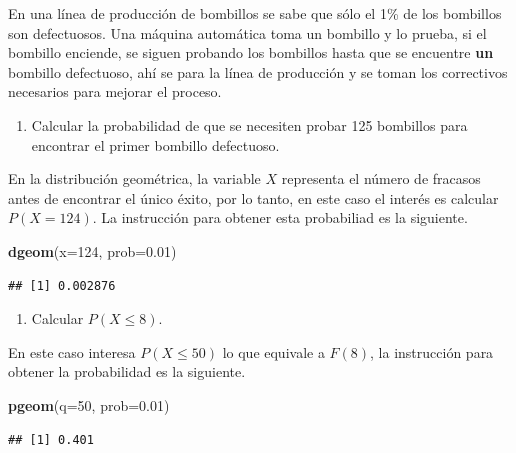 \documentclass[10pt,]{krantz}
\makeatletter
\newenvironment{Shaded}{\begin{snugshade}}{\end{snugshade}}
\newcommand{\KeywordTok}[1]{\textcolor[rgb]{0.13,0.29,0.53}{\textbf{{#1}}}}
\newcommand{\DataTypeTok}[1]{\textcolor[rgb]{0.13,0.29,0.53}{{#1}}}
\newcommand{\DecValTok}[1]{\textcolor[rgb]{0.00,0.00,0.81}{{#1}}}
\newcommand{\FloatTok}[1]{\textcolor[rgb]{0.00,0.00,0.81}{{#1}}}
\newcommand{\NormalTok}[1]{{#1}}
\providecommand{\tightlist}{%
  \setlength{\itemsep}{0pt}\setlength{\parskip}{0pt}}
\newenvironment{kframe}{%
\medskip{}
\setlength{\fboxsep}{.8em}
 \def\at@end@of@kframe{}%
 \ifinner\ifhmode%
  \def\at@end@of@kframe{\end{minipage}}%
  \begin{minipage}{\columnwidth}%
 \fi\fi%
 \def\FrameCommand##1{\hskip\@totalleftmargin \hskip-\fboxsep
 \colorbox{shadecolor}{##1}\hskip-\fboxsep
     \hskip-\linewidth \hskip-\@totalleftmargin \hskip\columnwidth}%
 \MakeFramed {\advance\hsize-\width
   \@totalleftmargin\z@ \linewidth\hsize
   \@setminipage}}%
 {\par\unskip\endMakeFramed%
 \at@end@of@kframe}
\renewenvironment{Shaded}{\begin{kframe}}{\end{kframe}}
\makeatother
\begin{document}
En una línea de producción de bombillos se sabe que sólo el 1\% de los
bombillos son defectuosos. Una máquina automática toma un bombillo y lo
prueba, si el bombillo enciende, se siguen probando los bombillos hasta
que se encuentre \textbf{un} bombillo defectuoso, ahí se para la línea
de producción y se toman los correctivos necesarios para mejorar el
proceso.

\begin{enumerate}
\def\labelenumi{\arabic{enumi})}
\tightlist
\item
  Calcular la probabilidad de que se necesiten probar 125 bombillos para
  encontrar el primer bombillo defectuoso.
\end{enumerate}

En la distribución geométrica, la variable \(X\) representa el número de
fracasos antes de encontrar el único éxito, por lo tanto, en este caso
el interés es calcular \(P(X=124)\). La instrucción para obtener esta
probabiliad es la siguiente.

\begin{Shaded}
\begin{Highlighting}[]
\KeywordTok{dgeom}\NormalTok{(}\DataTypeTok{x=}\DecValTok{124}\NormalTok{, }\DataTypeTok{prob=}\FloatTok{0.01}\NormalTok{)}
\end{Highlighting}
\end{Shaded}

\begin{verbatim}
## [1] 0.002876
\end{verbatim}

\begin{enumerate}
\def\labelenumi{\arabic{enumi})}
\setcounter{enumi}{1}
\tightlist
\item
  Calcular \(P(X \leq 8)\).
\end{enumerate}

En este caso interesa \(P(X \leq 50)\) lo que equivale a \(F(8)\), la
instrucción para obtener la probabilidad es la siguiente.

\begin{Shaded}
\begin{Highlighting}[]
\KeywordTok{pgeom}\NormalTok{(}\DataTypeTok{q=}\DecValTok{50}\NormalTok{, }\DataTypeTok{prob=}\FloatTok{0.01}\NormalTok{)}
\end{Highlighting}
\end{Shaded}

\begin{verbatim}
## [1] 0.401
\end{verbatim}
\end{document}
